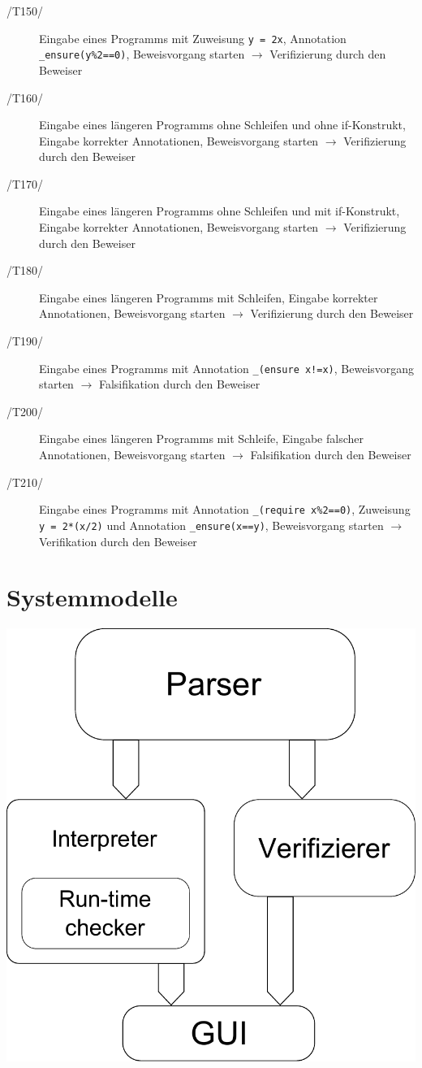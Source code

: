 \documentclass[a4paper,10pt]{article}
\begin{document}
\begin{description}
\item[/T150/] Eingabe eines Programms mit Zuweisung \texttt{y = 2x}, Annotation \texttt{\_ensure(y\%2==0)}, Beweisvorgang starten $\to$ Verifizierung durch den Beweiser
\item[/T160/] Eingabe eines längeren Programms ohne Schleifen und ohne if-Konstrukt, Eingabe korrekter Annotationen, Beweisvorgang starten $\to$ Verifizierung durch den Beweiser
\item[/T170/] Eingabe eines längeren Programms ohne Schleifen und mit if-Konstrukt, Eingabe korrekter Annotationen, Beweisvorgang starten $\to$ Verifizierung durch den Beweiser
\item[/T180/] Eingabe eines längeren Programms mit Schleifen, Eingabe korrekter Annotationen, Beweisvorgang starten $\to$ Verifizierung durch den Beweiser
\item[/T190/] Eingabe eines Programms mit Annotation \texttt{\_(ensure x!=x)}, Beweisvorgang starten $\to$ Falsifikation durch den Beweiser
\item[/T200/] Eingabe eines längeren Programms mit Schleife, Eingabe falscher Annotationen, Beweisvorgang starten $\to$ Falsifikation durch den Beweiser
\item[/T210/] Eingabe eines Programms mit Annotation \texttt{\_(require x\%2==0)}, Zuweisung \texttt{y = 2*(x/2)} und Annotation \texttt{\_ensure(x==y)}, Beweisvorgang starten $\to$ Verifikation durch den Beweiser
\end{description}

\section{Systemmodelle}

\includegraphics{systemmodelle.pdf}
\end{document}
